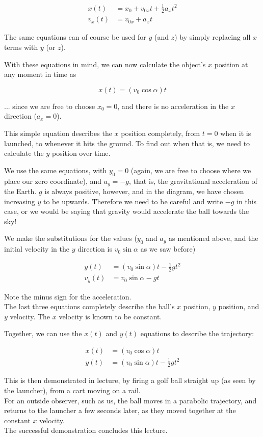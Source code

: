 \documentclass[8.01x]{subfiles}
\begin{document}
\begin{align}
x(t) &= x_0 + v_{0x} t + \frac{1}{2} a_x t^2\\
v_x(t) &= v_{0x} + a_x t
\end{align}

The same equations can of course be used for $y$ (and $z$) by simply replacing all $x$ terms with $y$ (or $z$).

With these equations in mind, we can now calculate the object's $x$ position at any moment in time as

\begin{equation}
x(t) = (v_0 \cos \alpha) t
\end{equation}

... since we are free to choose $x_0 = 0$, and there is no acceleration in the $x$ direction ($a_x = 0$).

This simple equation describes the $x$ position completely, from $t=0$ when it is launched, to whenever it hits the ground. To find out when that is, we need to calculate the $y$ position over time.

We use the same equations, with $y_0 = 0$	 (again, we are free to choose where we place our zero coordinate), and $a_y = -g$, that is, the gravitational acceleration of the Earth. $g$ is always positive, however, and in the diagram, we have chosen increasing $y$ to be upwards. Therefore we need to be careful and write $-g$ in this case, or we would be saying that gravity would accelerate the ball towards the sky!

We make the substitutions for the values ($y_0$ and $a_y$ as mentioned above, and the initial velocity in the $y$ direction is $v_0 \sin \alpha$ as we saw before)

\begin{align}
y(t) &= (v_0 \sin \alpha) t - \frac{1}{2} g t^2\\
v_y(t) &= v_0 \sin \alpha - g t
\end{align}

Note the minus sign for the acceleration.\\
The last three equations completely describe the ball's $x$ position, $y$ position, and $y$ velocity. The $x$ velocity is known to be constant.

Together, we can use the $x(t)$ and $y(t)$ equations to describe the trajectory:

\begin{align*}
x(t) &= (v_0 \cos \alpha) t\\
y(t) &= (v_0 \sin \alpha) t - \frac{1}{2} g t^2
\end{align*}

This is then demonstrated in lecture, by firing a golf ball straight up (as seen by the launcher), from a cart moving on a rail.\\
For an outside observer, such as us, the ball moves in a parabolic trajectory, and returns to the launcher a few seconds later, as they moved together at the constant $x$ velocity.\\
The successful demonstration concludes this lecture.
\end{document}
